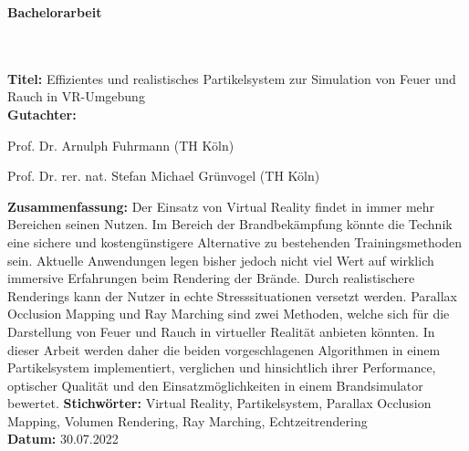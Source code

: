 \addtocounter{page}{1}

\begin{flushleft}
	\begin{huge}
		\textbf{Bachelorarbeit}
	\end{huge}
	~\\
	~\\
	\textbf{Titel:}  Effizientes und realistisches Partikelsystem zur Simulation von Feuer und Rauch in VR-Umgebung
	~\\
	\doublespacing
	\textbf{Gutachter:}
	\begin{description}
		\vspace{-0.2cm}
		\itemsep-8pt
		\item[–]
			Prof. Dr. Arnulph Fuhrmann (TH Köln)
		\item[–]
			Prof. Dr. rer. nat. Stefan Michael Grünvogel (TH Köln)
	\end{description}
	\vspace{-0.4cm}
	\singlespacing
	\textbf{Zusammenfassung:} Der Einsatz von Virtual Reality findet in immer mehr Bereichen
	seinen Nutzen. Im Bereich der Brandbekämpfung könnte die Technik eine sichere und
	kostengünstigere Alternative zu bestehenden Trainingsmethoden sein.
	Aktuelle Anwendungen legen bisher jedoch nicht viel Wert auf wirklich immersive Erfahrungen
	beim Rendering der Brände. Durch realistischere Renderings kann der Nutzer in echte Stresssituationen
	versetzt werden. Parallax Occlusion Mapping und Ray Marching sind zwei Methoden, welche sich für die
	Darstellung von Feuer und Rauch in virtueller Realität anbieten könnten.
	In dieser Arbeit werden daher die beiden vorgeschlagenen Algorithmen in einem Partikelsystem implementiert, verglichen und
	hinsichtlich ihrer Performance, optischer Qualität und den Einsatzmöglichkeiten in einem Brandsimulator bewertet.
	\singlespacing
	\textbf{Stichwörter:} Virtual Reality, Partikelsystem, Parallax Occlusion Mapping, Volumen Rendering, Ray Marching, Echtzeitrendering\\
	\doublespacing
	\textbf{Datum:} 30.07.2022


	\vspace{1cm}


\end{flushleft}
